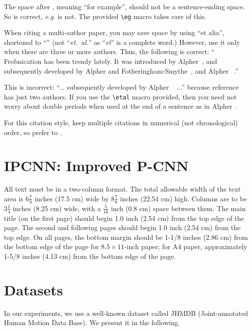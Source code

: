 \documentclass[10pt,twocolumn,letterpaper]{article}
\begin{document}
The space after \eg, meaning ``for example'', should not be a
sentence-ending space. So \eg is correct, {\em e.g.} is not.  The provided
\verb'\eg' macro takes care of this.

When citing a multi-author paper, you may save space by using ``et alia'',
shortened to ``\etal'' (not ``{\em et.\ al.}'' as ``{\em et}'' is a complete word.)
However, use it only when there are three or more authors.  Thus, the
following is correct: ``
   Frobnication has been trendy lately.
   It was introduced by Alpher~\cite{Alpher02}, and subsequently developed by
   Alpher and Fotheringham-Smythe~\cite{Alpher03}, and Alpher \etal~\cite{Alpher04}.''

This is incorrect: ``... subsequently developed by Alpher \etal~\cite{Alpher03} ...''
because reference~\cite{Alpher03} has just two authors.  If you use the
\verb'\etal' macro provided, then you need not worry about double periods
when used at the end of a sentence as in Alpher \etal.

For this citation style, keep multiple citations in numerical (not
chronological) order, so prefer \cite{Alpher03,Alpher02,Authors13} to
\cite{Alpher02,Alpher03,Authors13}.




\section{IPCNN: Improved P-CNN}
\label{ipcnn}
All text must be in a two-column format. The total allowable width of the
text area is $6\frac78$ inches (17.5 cm) wide by $8\frac78$ inches (22.54
cm) high. Columns are to be $3\frac14$ inches (8.25 cm) wide, with a
$\frac{5}{16}$ inch (0.8 cm) space between them. The main title (on the
first page) should begin 1.0 inch (2.54 cm) from the top edge of the
page. The second and following pages should begin 1.0 inch (2.54 cm) from
the top edge. On all pages, the bottom margin should be 1-1/8 inches (2.86
cm) from the bottom edge of the page for $8.5 \times 11$-inch paper; for A4
paper, approximately 1-5/8 inches (4.13 cm) from the bottom edge of the
page.

\section{Datasets}
\label{dataset}
In our experiments, we use a well-known dataset called JHMDB (Joint-annotated Human Motion Data Base)\cite{jhuang2013towards}. We present it in the following.
\end{document}
